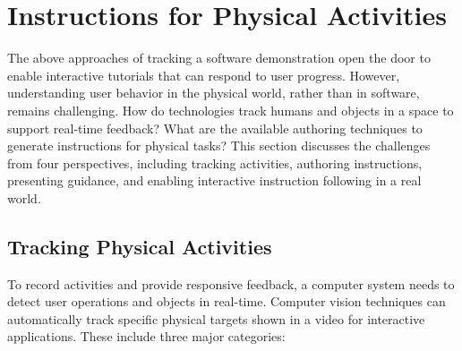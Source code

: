 


\section{Instructions for Physical Activities}
\label{related_physical}

The above approaches of tracking a software demonstration open the door to enable interactive tutorials that can respond to user progress. However, understanding user behavior in the physical world, rather than in software, remains challenging.
%
How do technologies track humans and objects in a space to support real-time feedback? What are the available authoring techniques to generate instructions for physical tasks?
%
This section discusses the challenges from four perspectives, including tracking activities, authoring instructions, presenting guidance, and enabling interactive instruction following in a real world.


\subsection{Tracking Physical Activities}
To record activities and provide responsive feedback, a computer system needs to detect user operations and objects in real-time.
%
Computer vision techniques can automatically track specific physical targets shown in a video for interactive applications. These include three major categories:

